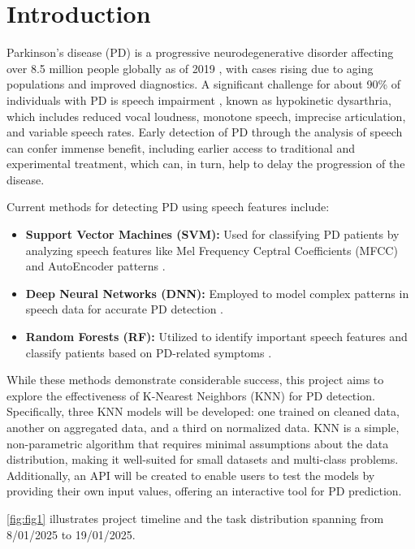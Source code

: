 \section{Introduction}

Parkinson's disease (PD) is a progressive neurodegenerative disorder affecting
over 8.5 million people globally as of 2019 \cite{WHO2022}, with cases rising
due to aging populations and improved diagnostics. A significant challenge for
about 90\% of individuals with PD is speech impairment \cite{IndianaParkinson},
known as hypokinetic dysarthria, which includes reduced vocal loudness,
monotone speech, imprecise articulation, and variable speech rates. Early
detection of PD through the analysis of speech can confer immense benefit,
including earlier access to traditional and experimental treatment, which can,
in turn, help to delay the progression of the disease.

Current methods for detecting PD using speech features include:

\begin{itemize}
	\item \textbf{Support Vector Machines (SVM):} Used for classifying PD
	      patients by analyzing speech features like Mel Frequency Ceptral
	      Coefficients (MFCC) and AutoEncoder patterns
	      \cite{SpringerSpeechProcessing}.
	\item \textbf{Deep Neural Networks (DNN):} Employed to model complex patterns
	      in speech data for accurate PD detection \cite{AIPDNN}.
	\item \textbf{Random Forests (RF):} Utilized to identify important speech
	      features and classify patients based on PD-related symptoms
	      \cite{SpringerMLPD}.
\end{itemize}

While these methods demonstrate considerable success, this project aims to
explore the effectiveness of K-Nearest Neighbors (KNN) for PD detection.
Specifically, three KNN models will be developed: one trained on cleaned data,
another on aggregated data, and a third on normalized data. KNN is a simple,
non-parametric algorithm that requires minimal assumptions about the data
distribution, making it well-suited for small datasets and multi-class
problems. Additionally, an API will be created to enable users to test the
models by providing their own input values, offering an interactive tool for PD
prediction.

\cref{fig:fig1} illustrates project timeline and the task distribution
spanning from 8/01/2025 to 19/01/2025.

